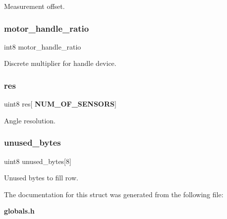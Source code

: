 Measurement offset. \mbox{\label{structst__encoder_a098badbb74d31ea6257e57f6d66823cc}} 
\subsubsection{motor\+\_\+handle\+\_\+ratio}
{\footnotesize\ttfamily int8 motor\+\_\+handle\+\_\+ratio}

Discrete multiplier for handle device. \mbox{\label{structst__encoder_ac2e19d167eac4c8ca9ce97c646e78595}} 
\subsubsection{res}
{\footnotesize\ttfamily uint8 res[\textbf{ N\+U\+M\+\_\+\+O\+F\+\_\+\+S\+E\+N\+S\+O\+RS}]}

Angle resolution. \mbox{\label{structst__encoder_ab2479545d632531da12aab41325a8d8f}} 
\subsubsection{unused\+\_\+bytes}
{\footnotesize\ttfamily uint8 unused\+\_\+bytes[8]}

Unused bytes to fill row. 

The documentation for this struct was generated from the following file\+:\begin{DoxyCompactItemize}
\item 
\textbf{ globals.\+h}\end{DoxyCompactItemize}
